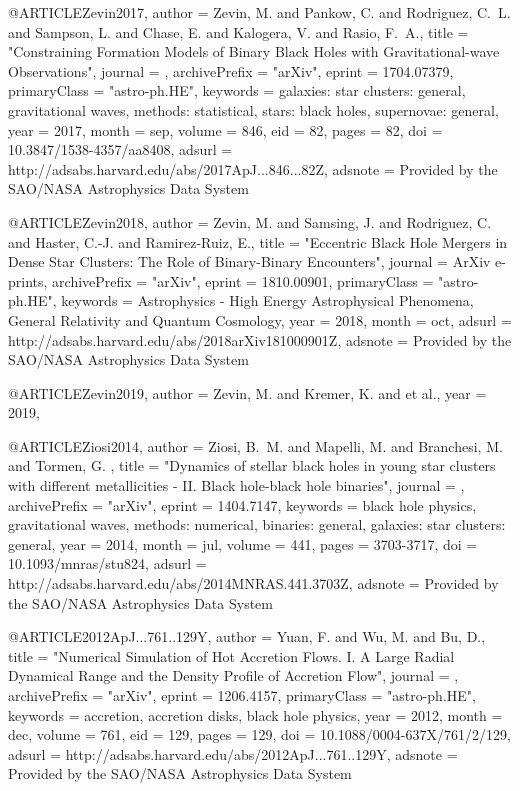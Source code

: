 \documentclass[twocolumn,tighten]{aastex63}
\begin{document}
{{{{{{@ARTICLE{Zevin2017,
   author = {{Zevin}, M. and {Pankow}, C. and {Rodriguez}, C.~L. and {Sampson}, L. and 
	{Chase}, E. and {Kalogera}, V. and {Rasio}, F.~A.},
    title = "{Constraining Formation Models of Binary Black Holes with Gravitational-wave Observations}",
  journal = {\apj},
archivePrefix = "arXiv",
   eprint = {1704.07379},
 primaryClass = "astro-ph.HE",
 keywords = {galaxies: star clusters: general, gravitational waves, methods: statistical, stars: black holes, supernovae: general},
     year = 2017,
    month = sep,
   volume = 846,
      eid = {82},
    pages = {82},
      doi = {10.3847/1538-4357/aa8408},
   adsurl = {http://adsabs.harvard.edu/abs/2017ApJ...846...82Z},
  adsnote = {Provided by the SAO/NASA Astrophysics Data System}
}

@ARTICLE{Zevin2018,
   author = {{Zevin}, M. and {Samsing}, J. and {Rodriguez}, C. and {Haster}, C.-J. and 
	{Ramirez-Ruiz}, E.},
    title = "{Eccentric Black Hole Mergers in Dense Star Clusters: The Role of Binary-Binary Encounters}",
  journal = {ArXiv e-prints},
archivePrefix = "arXiv",
   eprint = {1810.00901},
 primaryClass = "astro-ph.HE",
 keywords = {Astrophysics - High Energy Astrophysical Phenomena, General Relativity and Quantum Cosmology},
     year = 2018,
    month = oct,
   adsurl = {http://adsabs.harvard.edu/abs/2018arXiv181000901Z},
  adsnote = {Provided by the SAO/NASA Astrophysics Data System}
}

@ARTICLE{Zevin2019,
	author = {{Zevin}, M. and {Kremer}, K. and et al.},
     year = 2019,
}

@ARTICLE{Ziosi2014,
   author = {{Ziosi}, B.~M. and {Mapelli}, M. and {Branchesi}, M. and {Tormen}, G.
	},
    title = "{Dynamics of stellar black holes in young star clusters with different metallicities - II. Black hole-black hole binaries}",
  journal = {\mnras},
archivePrefix = "arXiv",
   eprint = {1404.7147},
 keywords = {black hole physics, gravitational waves, methods: numerical, binaries: general, galaxies: star clusters: general},
     year = 2014,
    month = jul,
   volume = 441,
    pages = {3703-3717},
      doi = {10.1093/mnras/stu824},
   adsurl = {http://adsabs.harvard.edu/abs/2014MNRAS.441.3703Z},
  adsnote = {Provided by the SAO/NASA Astrophysics Data System}
}


@ARTICLE{2012ApJ...761..129Y,
   author = {{Yuan}, F. and {Wu}, M. and {Bu}, D.},
    title = "{Numerical Simulation of Hot Accretion Flows. I. A Large Radial Dynamical Range and the Density Profile of Accretion Flow}",
  journal = {\apj},
archivePrefix = "arXiv",
   eprint = {1206.4157},
 primaryClass = "astro-ph.HE",
 keywords = {accretion, accretion disks, black hole physics},
     year = 2012,
    month = dec,
   volume = 761,
      eid = {129},
    pages = {129},
      doi = {10.1088/0004-637X/761/2/129},
   adsurl = {http://adsabs.harvard.edu/abs/2012ApJ...761..129Y},
  adsnote = {Provided by the SAO/NASA Astrophysics Data System}
} 

}}}}}}
\end{document}
